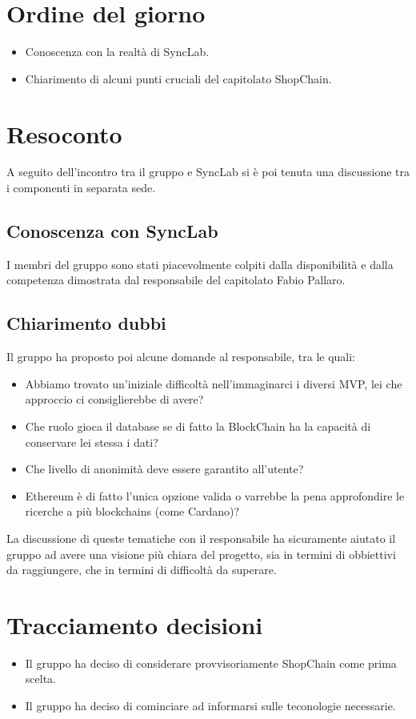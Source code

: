 \section{Ordine del giorno}
\begin{itemize}
    \item Conoscenza con la realtà di SyncLab.
    \item Chiarimento di alcuni punti cruciali del capitolato ShopChain.
\end{itemize}

\section{Resoconto}
A seguito dell'incontro tra il gruppo e SyncLab si è poi tenuta una discussione tra i componenti in separata sede.

\subsection{Conoscenza con SyncLab}
I membri del gruppo sono stati piacevolmente colpiti dalla disponibilità e dalla competenza dimostrata dal responsabile
del capitolato Fabio Pallaro.

\subsection{Chiarimento dubbi}
Il gruppo ha proposto poi alcune domande al responsabile, tra le quali:
\begin{itemize}
    \item Abbiamo trovato un'iniziale difficoltà nell'immaginarci i diversi MVP, lei che approccio ci consiglierebbe di avere?
    \item Che ruolo gioca il database se di fatto la BlockChain ha la capacità di conservare lei stessa i dati?
    \item Che livello di anonimità deve essere garantito all'utente?
    \item Ethereum è di fatto l'unica opzione valida o varrebbe la pena approfondire le ricerche a più blockchains (come Cardano)?
\end{itemize}
La discussione di queste tematiche con il responsabile ha sicuramente aiutato il gruppo ad avere una visione più chiara del progetto,
sia in termini di obbiettivi da raggiungere, che in termini di difficoltà da superare.
\section{Tracciamento decisioni}
\begin{itemize}
    \item Il gruppo ha deciso di considerare provvisoriamente ShopChain come prima scelta.
    \item Il gruppo ha deciso di cominciare ad informarsi sulle teconologie necessarie.
\end{itemize}